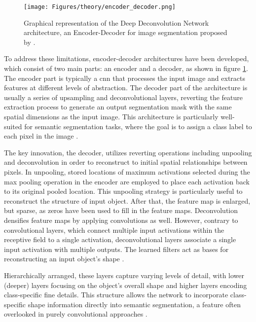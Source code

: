 \begin{figure}[htb]
    \centering
    \texttt{[image: Figures/theory/encoder\_decoder.png]}
    \caption[Encoder-Decoder Architecture]{Graphical representation of the Deep Deconvolution Network architecture, an Encoder-Decoder for image segmentation proposed by \textcite{Noh.Hong.ea2015}.}
    \label{fig:encoder_decoder}
\end{figure}

To address these limitations, encoder-decoder architectures have been developed, which consist of two main parts: an encoder and a decoder, as shown in figure \ref{fig:encoder_decoder}. The encoder part is typically a \gls{cnn} that processes the input image and extracts features at different levels of abstraction. The decoder part of the architecture is usually a series of upsampling and deconvolutional layers, reverting the feature extraction process to generate an output segmentation mask with the same spatial dimensions as the input image. This architecture is particularly well-suited for semantic segmentation tasks, where the goal is to assign a class label to each pixel in the image \autocite{Minaee.Boykov.ea2022,Noh.Hong.ea2015}.

The key innovation, the decoder, utilizes reverting operations including unpooling and deconvolution in order to reconstruct to initial spatial relationships between pixels. In unpooling, stored locations of maximum activations selected during the max pooling operation in the encoder are employed to place each activation back to its original pooled location. This unpooling strategy is particularly useful to reconstruct the structure of input object. After that, the feature map is enlarged, but sparse, as zeros have been used to fill in the feature maps. Deconvolution densifies feature maps by applying convolutions as well. However, contrary to convolutional layers, which connect multiple input activations within the receptive field to a single activation, deconvolutional layers associate a single input activation with multiple outputs. The learned filters act as bases for reconstructing an input object's shape \autocite{Badrinarayanan.Kendall.ea2017,Chen.Papandreou.ea2015,Noh.Hong.ea2015}.

Hierarchically arranged, these layers capture varying levels of detail, with lower (deeper) layers focusing on the object's overall shape and higher layers encoding class-specific fine details. This structure allows the network to incorporate class-specific shape information directly into semantic segmentation, a feature often overlooked in purely convolutional approaches \autocite{Chen.Papandreou.ea2015,Noh.Hong.ea2015}.

